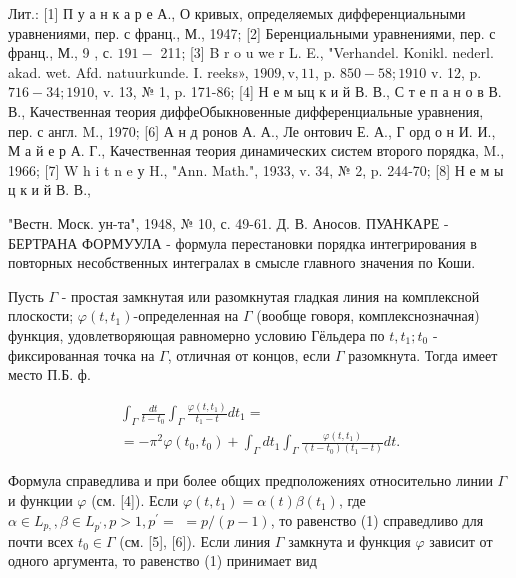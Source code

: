 \documentclass[10pt]{article}
\begin{document}
Лит.: [1] П у а н к а р е А., О кривых, определяемых дифференциальными уравнениями, пер. с франц., М., 1947; [2] Беренциальными уравнениями, пер. с франц., М., 9 , с. $191-$ 211; [3] B r o u we r L. E., "Verhandel. Konikl. nederl. akad. wet. Afd. natuurkunde. I. reeks», $1909, \mathrm{v}, 11$, p. $850-58 ; 1910$ v. 12, p. $716-34 ; 1910$, v. 13, № 1, p. 171-86; [4] Н е м ыц к и й В. В., С т е п а н о в В. В., Качественная теория диффеОбыкновенные дифференциальные уравнения, пер. с англ. M., 1970; [6] А н д ронов А. А., Ле онтович Е. А., Г орд о н И. И., М а й е р А. Г., Качественная теория динамических систем второго порядка, M., 1966; [7] W h i t n e у H., "Ann. Math.", 1933, v. 34, № 2, p. 244-70; [8] Н е м ы ц к и й В. В.,

"Вестн. Моск. ун-та", 1948, № 10, с. 49-61. Д. В. Аносов. ПУАНКАРЕ - БЕРТРАНА ФОРМУУЛА - формула перестановки порядка интегрирования в повторных несобственных интегралах в смысле главного значения по Коши.



Пусть $\Gamma$ - простая замкнутая или разомкнутая гладкая линия на комплексной плоскости; $\varphi\left(t, t_{1}\right)$-определенная на $\Gamma$ (вообще говоря, комплекснозначная) функция, удовлетворяющая равномерно условию Гёльдера по $t, t_{1} ; t_{0}$ - фиксированная точка на $\Gamma$, отличная от концов, если $\Gamma$ разомкнута. Тогда имеет место П.Б. ф.



\[

\begin{gathered}

\int_{\Gamma} \frac{d t}{t-t_{0}} \int_{\Gamma} \frac{\varphi\left(t, t_{1}\right)}{t_{1}-t} d t_{1}= \\

=-\pi^{2} \varphi\left(t_{0}, t_{0}\right)+\int_{\Gamma} d t_{1} \int_{\Gamma} \frac{\varphi\left(t, t_{1}\right)}{\left(t-t_{0}\right)\left(t_{1}-t\right)} d t .

\end{gathered}

\]



Формула справедлива и при более общих предположениях относительно линии $\Gamma$ и функции $\varphi$ (см. [4]). Если $\varphi\left(t, t_{1}\right)=\alpha(t) \beta\left(t_{1}\right)$, где $\alpha \in L_{p,}, \beta \in L_{p^{\prime}}, p>1, p^{\prime}=$ $=p /(p-1)$, то равенство (1) справедливо для почти всех $t_{0} \in \Gamma$ (см. [5], [6]). Если линия $\Gamma$ замкнута и функция $\varphi$ зависит от одного аргумента, то равенство (1) принимает вид
\end{document}

